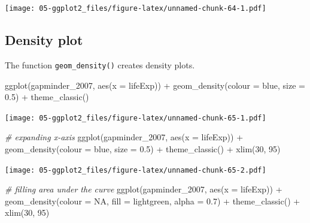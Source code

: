 \documentclass[
]{book}
\newenvironment{Shaded}{\begin{snugshade}}{\end{snugshade}}
\newcommand{\AttributeTok}[1]{\textcolor[rgb]{0.77,0.63,0.00}{#1}}
\newcommand{\CommentTok}[1]{\textcolor[rgb]{0.56,0.35,0.01}{\textit{#1}}}
\newcommand{\ConstantTok}[1]{\textcolor[rgb]{0.00,0.00,0.00}{#1}}
\newcommand{\DecValTok}[1]{\textcolor[rgb]{0.00,0.00,0.81}{#1}}
\newcommand{\FloatTok}[1]{\textcolor[rgb]{0.00,0.00,0.81}{#1}}
\newcommand{\FunctionTok}[1]{\textcolor[rgb]{0.00,0.00,0.00}{#1}}
\newcommand{\NormalTok}[1]{#1}
\newcommand{\SpecialCharTok}[1]{\textcolor[rgb]{0.00,0.00,0.00}{#1}}
\newcommand{\StringTok}[1]{\textcolor[rgb]{0.31,0.60,0.02}{#1}}
\begin{document}
\texttt{[image: 05-ggplot2\_files/figure-latex/unnamed-chunk-64-1.pdf]}

\hypertarget{density-plot}{%
\subsection{Density plot}\label{density-plot}}

The function \texttt{geom\_density()} creates density plots.

\begin{Shaded}
\begin{Highlighting}[]
\FunctionTok{ggplot}\NormalTok{(gapminder\_2007, }\FunctionTok{aes}\NormalTok{(}\AttributeTok{x =}\NormalTok{ lifeExp)) }\SpecialCharTok{+} 
   \FunctionTok{geom\_density}\NormalTok{(}\AttributeTok{colour =} \StringTok{\textquotesingle{}blue\textquotesingle{}}\NormalTok{, }\AttributeTok{size =} \FloatTok{0.5}\NormalTok{) }\SpecialCharTok{+}
   \FunctionTok{theme\_classic}\NormalTok{()}
\end{Highlighting}
\end{Shaded}

\texttt{[image: 05-ggplot2\_files/figure-latex/unnamed-chunk-65-1.pdf]}

\begin{Shaded}
\begin{Highlighting}[]


\CommentTok{\# expanding x{-}axis}
\FunctionTok{ggplot}\NormalTok{(gapminder\_2007, }\FunctionTok{aes}\NormalTok{(}\AttributeTok{x =}\NormalTok{ lifeExp)) }\SpecialCharTok{+} 
   \FunctionTok{geom\_density}\NormalTok{(}\AttributeTok{colour =} \StringTok{\textquotesingle{}blue\textquotesingle{}}\NormalTok{, }\AttributeTok{size =} \FloatTok{0.5}\NormalTok{) }\SpecialCharTok{+}
   \FunctionTok{theme\_classic}\NormalTok{() }\SpecialCharTok{+}
\FunctionTok{xlim}\NormalTok{(}\DecValTok{30}\NormalTok{, }\DecValTok{95}\NormalTok{)}
\end{Highlighting}
\end{Shaded}

\texttt{[image: 05-ggplot2\_files/figure-latex/unnamed-chunk-65-2.pdf]}

\begin{Shaded}
\begin{Highlighting}[]


\CommentTok{\# filling area under the curve}
\FunctionTok{ggplot}\NormalTok{(gapminder\_2007, }\FunctionTok{aes}\NormalTok{(}\AttributeTok{x =}\NormalTok{ lifeExp)) }\SpecialCharTok{+} 
   \FunctionTok{geom\_density}\NormalTok{(}\AttributeTok{colour =} \ConstantTok{NA}\NormalTok{, }\AttributeTok{fill =} \StringTok{\textquotesingle{}lightgreen\textquotesingle{}}\NormalTok{, }\AttributeTok{alpha =} \FloatTok{0.7}\NormalTok{) }\SpecialCharTok{+}
   \FunctionTok{theme\_classic}\NormalTok{() }\SpecialCharTok{+}
   \FunctionTok{xlim}\NormalTok{(}\DecValTok{30}\NormalTok{, }\DecValTok{95}\NormalTok{)}
\end{Highlighting}
\end{Shaded}
\end{document}
